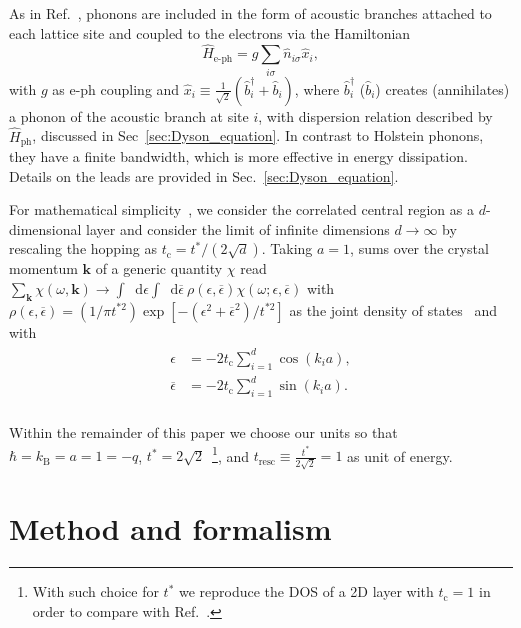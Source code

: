 \documentclass[aps,prb,groupedaddress,showpacs,twocolumn,superscriptaddress,10pt]{revtex4-2}
\newcommand*\dd{\mathop{}\!\mathrm{d}}
\renewcommand{\vec}[1]{\bm{#1}} %
\begin{document}
As in Ref.~\cite{ma.ga.22}, phonons are included in the form of acoustic  branches attached to each lattice site and coupled to the electrons via the Hamiltonian 
% 
\begin{equation}\label{eq:e-ph_ham} 
\hat{H}_{\text{e-ph}} = g \sum_{i\sigma} \hat{n}_{i\sigma} \hat{x}_{i},
\end{equation}
% 
with $g$ as e-ph coupling and $\hat{x}_{i} \equiv \frac{1}{\sqrt{2}} \left( \hat{b}^{\dagger}_{i} + \hat{b}_i \right)$, where $\hat{b}^{\dagger}_{i}$ ($\hat{b}_{i}$) creates (annihilates) a phonon of the acoustic branch at site $i$, with dispersion relation described by $\hat{H}_{\text{ph}}$, discussed in Sec~\ref{sec:Dyson_equation}. In contrast to Holstein phonons, they have a finite bandwidth, which is more effective in energy dissipation. Details on the leads are provided in Sec.~\ref{sec:Dyson_equation}.    
 
For mathematical simplicity~\cite{ge.ko.92,ao.ts.14}, we consider the correlated central region as a $d$-dimensional layer and consider the limit of infinite dimensions $d \rightarrow \infty$ by rescaling the hopping as $t_{\text{c}}=t^{\ast}/(2\sqrt{d})$. Taking $a=1$, sums over the crystal momentum $\vec{k}$ of a generic quantity $\chi$ read $\sum_{\vec{k}} \chi(\omega,\vec{k}) \rightarrow \int \dd\epsilon \int   \dd\overline{\epsilon} \ \rho(\epsilon,\overline{\epsilon}) \chi(\omega;\epsilon,\overline{\epsilon})$ with $\rho(\epsilon,\overline{\epsilon}) = (1/\pi t^{\ast 2}) \exp[-( \epsilon^{2} + \overline{\epsilon}^{2})/t^{\ast 2}]$ as the joint density of states~\cite{ts.ok.08} and with
% 
\begin{align}\label{eq:d-dim_crystal_dep}
\begin{split}
\epsilon & = -2t_{\text{c}} \sum_{i=1}^{d} \cos(k_i a), \\  
\overline{\epsilon}& = -2t_{\text{c}}\sum_{i=1}^{d} \sin(k_i a). \\
\end{split}  
\end{align}
  
Within the remainder of this paper we choose our units so that  $\hbar = k_{\text{B}} = a = 1 = -q$, $t^{\ast}=2\sqrt{2}$~\footnote{With such choice for $t^{\ast}$ we reproduce the DOS of a 2D layer with $t_{\text{c}}=1$  in order to compare with Ref.~\cite{so.do.18}.}, and $t_{\text{resc}} \equiv \frac{t^{\ast}}{2\sqrt{2}}=1$ as unit of energy.  
  

\section{Method and formalism}    
\label{sec:Method_formalism}  
\end{document}
